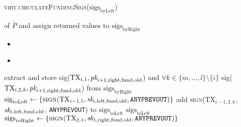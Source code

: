\begin{center}
\begin{processbox}{\textsc{virt.circulateFundingSigs}($\mathrm{sigs}_{\mathrm{byLeft}}$)}
\begin{algorithmic}[1]
{        of $\bar{P}$ and assign returned values to
        $\mathrm{sigs}_{\mathrm{byRight}}$}
        \State {}
        \begin{itemize}
          \item {}
        \end{itemize}
        \Indent
          \State {}
        \EndIndent
        \begin{itemize}
          \item {}
        \end{itemize}
        \Indent
          \State {}
          \Indent
            \State {}
          \EndIndent
        \EndIndent
        \State {}
        \State extract and store sig($\mathrm{TX}_{i, 1}, \textit{pk}_{i+1,
        \mathrm{right}, \mathrm{fund}, \mathrm{old}}$) and $\forall k \in \{m,
        \dots, l\} \setminus \{i\}$ sig($\mathrm{TX}_{i, 2, k}, \textit{pk}_{i+1,
        \mathrm{right}, \mathrm{fund}, \mathrm{old}}$) from
        $\mathrm{sigs}_{\mathrm{byRight}}$ 
        \State $\mathrm{sig}_{\mathrm{toLeft}} \gets
        \{\textsc{sign}(\mathrm{TX}_{i-1, 1}, \textit{sk}_{i, \mathrm{left},
        \mathrm{fund}, \mathrm{old}}, \texttt{ANYPREVOUT})\}$
            \State add \textsc{sign}($\mathrm{TX}_{i-1, 2, k}$,
            $\textit{sk}_{i, \mathrm{left}, \mathrm{fund}, \mathrm{old}}$,
            \texttt{ANYPREVOUT}) to $\mathrm{sigs}_{\mathrm{toLeft}}$
          \EndFor
        \EndIf
        \State \Return $\mathrm{sigs}_{\mathrm{toLeft}}$
       
        \State $\mathrm{sigs}_{\mathrm{toRight}} \gets
        \{\textsc{sign}(\mathrm{TX}_{2, 1}, \textit{sk}_{1, \mathrm{right},
        \mathrm{fund}, \mathrm{old}}, \texttt{ANYPREVOUT})\}$
        \label{code:virtual-layer:funding-sigs:funder-sign-first}

\end{algorithmic}
\end{processbox}
\end{center}
